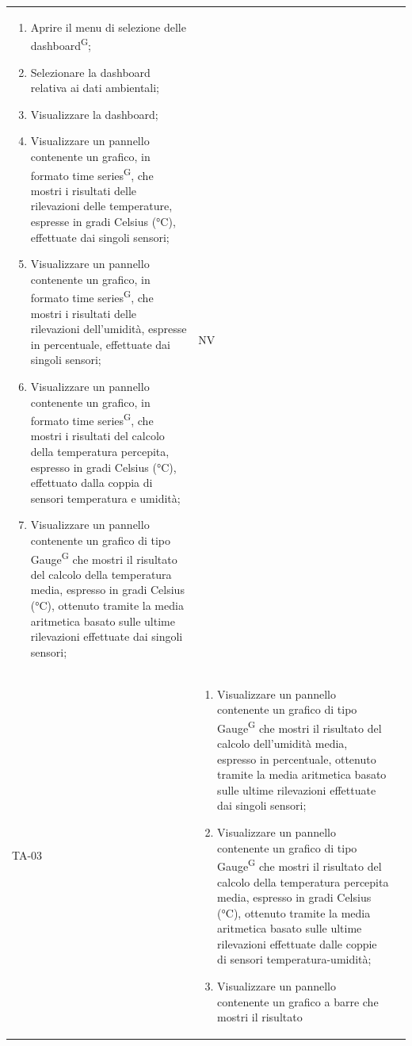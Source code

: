 \documentclass[8pt]{article}
\newcommand{\glossterm}[1]{#1\textsuperscript{G}} %
\begin{document}
\begin{longtable}{|>{\centering}p{2cm}|>{\RaggedRight}m{12cm}|>{\centering\arraybackslash}p{2cm}|}
\begin{enumerate}
        \setlength\itemsep{0em}
        \item Aprire il menu di selezione delle \glossterm{dashboard};
        \item Selezionare la dashboard relativa ai dati ambientali;
        \item Visualizzare la dashboard;
        \item Visualizzare un pannello contenente un grafico, in formato \glossterm{time series}, che mostri i
            risultati delle rilevazioni delle temperature, espresse in gradi Celsius (°C),
            effettuate dai singoli sensori;
        \item Visualizzare un pannello contenente un grafico, in formato \glossterm{time series}, che mostri i
            risultati delle rilevazioni dell’umidità, espresse in percentuale, effettuate dai
            singoli sensori;
        \item Visualizzare un pannello contenente un grafico, in formato \glossterm{time series}, che mostri i
            risultati del calcolo della temperatura percepita, espresso in gradi Celsius (°C),
            effettuato dalla coppia di sensori temperatura e umidità;
        \item Visualizzare un pannello contenente un grafico di tipo \glossterm{Gauge} che mostri il risultato
            del calcolo della temperatura media, espresso in gradi Celsius (°C), ottenuto tramite la
            media aritmetica basato sulle ultime rilevazioni effettuate dai singoli sensori;
    \end{enumerate}
    & NV \\
        TA-03 &
        \begin{enumerate}[start=8]
        \item Visualizzare un pannello contenente un grafico di tipo \glossterm{Gauge} che mostri il risultato
            del calcolo dell'umidità media, espresso in percentuale, ottenuto tramite la
            media aritmetica basato sulle ultime rilevazioni effettuate dai singoli sensori;
        \item Visualizzare un pannello contenente un grafico di tipo \glossterm{Gauge} che mostri il risultato
            del calcolo della temperatura percepita media, espresso in gradi Celsius (°C), ottenuto tramite la
            media aritmetica basato sulle ultime rilevazioni effettuate dalle coppie di sensori temperatura-umidità;
        \item Visualizzare un pannello contenente un grafico a barre che mostri il risultato

\end{enumerate}
\end{longtable}
\end{document}
